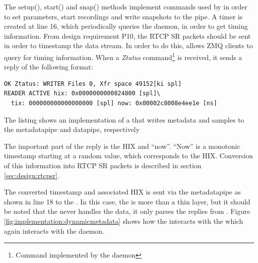The setup(), start() and snap() methods implement commands used by  in order to set parameters, start recordings and write snapshots to the pipe.
A timer is created at line 16, which periodically queries the  daemon, in order to get timing information. From design requirement P10, the RTCP SR packets should be sent in order to timestamp the data stream. In order to do this,  allows ZMQ clients to query for timing information. When a \textit{Ztatus} command\footnote{Command implemented by the  daemon} is received, it sends a reply of the following format:


\begin{listing}[H] 
\begin{verbatim}
OK Ztatus: WRITER Files 0, Xfr space 49152[ki spl]
READER ACTIVE hix: 0x0000000000824800 [spl]\ 
  tix: 000000000000000000 [spl] now: 0x00002c8008e4ee1e [ns]
\end{verbatim}
\caption{The listing shows an implementation of a \pro{} that writes metadata and samples to the metadatapipe and datapipe, respectively}
\label{lst:implementation:snapshot1}
\end{listing}

The important part of the reply is the \ac{HIX} and ``now''. ``Now'' is a monotonic timestamp starting at a random value, which corresponds to the \ac{HIX}. Conversion of this information into RTCP SR packets is described in section \ref{sec:design:rtcpsr}.

The converted timestamp and associated \ac{HIX} is sent via the metadatapipe as shown in line 18 to the \pro{}. In this case, the \pro{} is more than a thin layer, but it should be noted that the \pro{} never handles the data, it only parses the replies from .
Figure \ref{fig:implementation:dynamicmetadata} shows how the \pub{} interacts with the \pro{} which again interacts with the \program{Snapshot} daemon.


